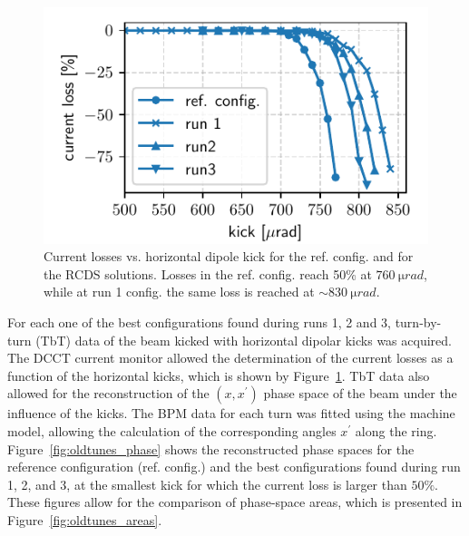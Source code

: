 \documentclass[a4paper,
               keeplastbox,   %
               ]{jacow}
\begin{document}
\begin{figure}[!h]
   \includegraphics[width=\columnwidth]{old_tunes_kick_resilience.pdf}
   \caption{Current losses vs. horizontal dipole kick for the ref. config. and for the RCDS solutions. Losses in the ref. config. reach 50\% at $760~\si{\micro rad}$, while at run 1 config. the same loss is reached at $\sim 830~\si{\micro rad}$.}
   \label{fig:loss_kicks}
\end{figure}
For each one of the best configurations found during runs 1, 2 and 3, turn-by-turn (TbT) data of the beam kicked with horizontal dipolar kicks was acquired. The DCCT current monitor allowed the determination of the current losses as a function of the horizontal kicks, which is shown by Figure~\ref{fig:loss_kicks}. TbT data also allowed for the reconstruction of the $(x,x^\prime)$ phase space of the beam under the influence of the kicks. The BPM data for each turn was fitted using the machine model, allowing the calculation of the corresponding angles $x^\prime$ along the ring. Figure~\ref{fig:oldtunes_phase} shows the reconstructed phase spaces for the reference configuration (ref. config.) and the best configurations found during run 1, 2, and 3, at the smallest kick for which the current loss is larger than $50\%$. These figures allow for the comparison of phase-space areas, which is presented in Figure~\ref{fig:oldtunes_areas}.
\end{document}
